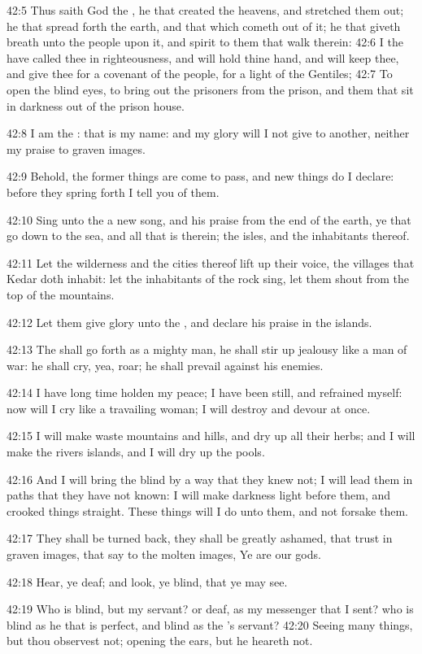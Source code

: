 42:5 Thus saith God the \LORD, he that created the heavens, and stretched them out; he that spread forth the earth, and that which cometh out of it; he that giveth breath unto the people upon it, and spirit to them that walk therein: 42:6 I the \LORD have called thee in righteousness, and will hold thine hand, and will keep thee, and give thee for a covenant of the people, for a light of the Gentiles; 42:7 To open the blind eyes, to bring out the prisoners from the prison, and them that sit in darkness out of the prison house.

42:8 I am the \LORD: that is my name: and my glory will I not give to another, neither my praise to graven images.

42:9 Behold, the former things are come to pass, and new things do I declare: before they spring forth I tell you of them.

42:10 Sing unto the \LORD a new song, and his praise from the end of the earth, ye that go down to the sea, and all that is therein; the isles, and the inhabitants thereof.

42:11 Let the wilderness and the cities thereof lift up their voice, the villages that Kedar doth inhabit: let the inhabitants of the rock sing, let them shout from the top of the mountains.

42:12 Let them give glory unto the \LORD, and declare his praise in the islands.

42:13 The \LORD shall go forth as a mighty man, he shall stir up jealousy like a man of war: he shall cry, yea, roar; he shall prevail against his enemies.

42:14 I have long time holden my peace; I have been still, and refrained myself: now will I cry like a travailing woman; I will destroy and devour at once.

42:15 I will make waste mountains and hills, and dry up all their herbs; and I will make the rivers islands, and I will dry up the pools.

42:16 And I will bring the blind by a way that they knew not; I will lead them in paths that they have not known: I will make darkness light before them, and crooked things straight. These things will I do unto them, and not forsake them.

42:17 They shall be turned back, they shall be greatly ashamed, that trust in graven images, that say to the molten images, Ye are our gods.

42:18 Hear, ye deaf; and look, ye blind, that ye may see.

42:19 Who is blind, but my servant? or deaf, as my messenger that I sent?  who is blind as he that is perfect, and blind as the \LORD's servant?  42:20 Seeing many things, but thou observest not; opening the ears, but he heareth not.

